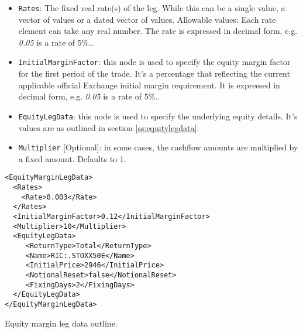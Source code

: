 \begin{itemize}

\item
\lstinline!Rates!: The fixed real rate(s) of the leg. While this can be a single value, a vector of values or a dated vector of
  values. Allowable values: Each rate element can take any  real number. The rate is expressed in decimal form, e.g. \emph{0.05} is a rate of 5\%..

\item
\lstinline!InitialMarginFactor!: this node is used to specify the equity margin factor for the first period of the trade. It's a percentage that reflecting the current applicable official Exchange initial margin requirement. It is expressed in decimal form, e.g. \emph{0.05} is a rate of 5\%..

\item
\lstinline!EquityLegData!: this node is used to specify the underlying equity details. It's values are as outlined in section \ref{ss:equitylegdata}.

\item
\lstinline!Multiplier! [Optional]: in some cases, the cashflow amounts are multiplied by a fixed amount. Defaults to 1.

\end{itemize}

\begin{listing}[h!]
\begin{verbatim}
<EquityMarginLegData>
  <Rates>
    <Rate>0.003</Rate>
  </Rates>
  <InitialMarginFactor>0.12</InitialMarginFactor>
  <Multiplier>10</Multiplier>
  <EquityLegData>
     <ReturnType>Total</ReturnType>
     <Name>RIC:.STOXX50E</Name>
     <InitialPrice>2946</InitialPrice>
     <NotionalReset>false</NotionalReset>
     <FixingDays>2</FixingDays>
  </EquityLegData>
</EquityMarginLegData>
\end{verbatim}
\caption{Equity margin leg data outline.}
\label{lst:equity_margin_leg_data}
\end{listing}
